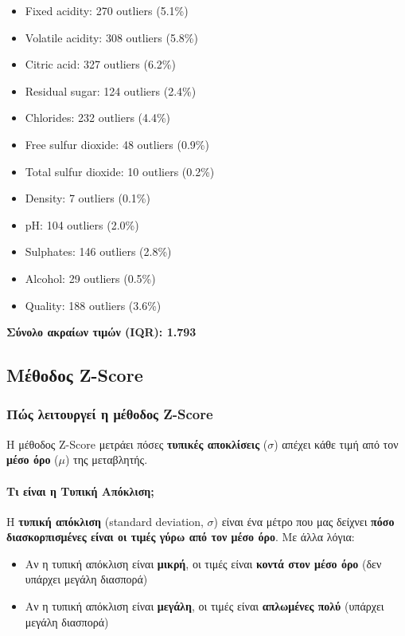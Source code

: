 \documentclass[12pt,a4paper]{article}
\begin{document}
\begin{itemize}
    \item Fixed acidity: 270 outliers (5.1\%)
    \item Volatile acidity: 308 outliers (5.8\%)
    \item Citric acid: 327 outliers (6.2\%)
    \item Residual sugar: 124 outliers (2.4\%)
    \item Chlorides: 232 outliers (4.4\%)
    \item Free sulfur dioxide: 48 outliers (0.9\%)
    \item Total sulfur dioxide: 10 outliers (0.2\%)
    \item Density: 7 outliers (0.1\%)
    \item pH: 104 outliers (2.0\%)
    \item Sulphates: 146 outliers (2.8\%)
    \item Alcohol: 29 outliers (0.5\%)
    \item Quality: 188 outliers (3.6\%)
\end{itemize}

\textbf{Σύνολο ακραίων τιμών (IQR): 1.793}

\subsection{Μέθοδος Z-Score}

\subsubsection{Πώς λειτουργεί η μέθοδος Z-Score}

Η μέθοδος Z-Score μετράει πόσες \textbf{τυπικές αποκλίσεις} ($\sigma$) απέχει κάθε τιμή από τον \textbf{μέσο όρο} ($\mu$) της μεταβλητής.

\paragraph{Τι είναι η Τυπική Απόκλιση;}

Η \textbf{τυπική απόκλιση} (standard deviation, $\sigma$) είναι ένα μέτρο που μας δείχνει \textbf{πόσο διασκορπισμένες είναι οι τιμές γύρω από τον μέσο όρο}. Με άλλα λόγια:

\begin{itemize}
    \item Αν η τυπική απόκλιση είναι \textbf{μικρή}, οι τιμές είναι \textbf{κοντά στον μέσο όρο} (δεν υπάρχει μεγάλη διασπορά)
    \item Αν η τυπική απόκλιση είναι \textbf{μεγάλη}, οι τιμές είναι \textbf{απλωμένες πολύ} (υπάρχει μεγάλη διασπορά)
\end{itemize}
\end{document}
